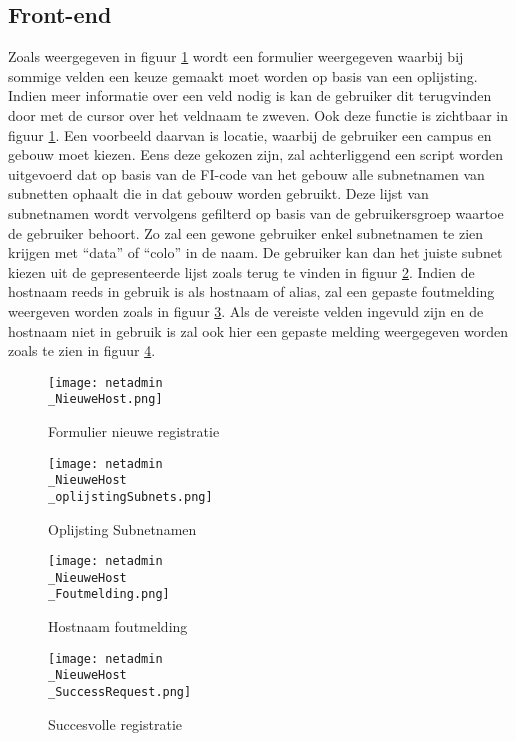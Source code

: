 \subsection{Front-end}
Zoals weergegeven in figuur \ref{fig:netadmin_NieuweHost} wordt een formulier weergegeven waarbij bij sommige velden een keuze gemaakt moet worden op basis van een oplijsting. Indien meer informatie over een veld nodig is kan de gebruiker dit terugvinden door met de cursor over het veldnaam te zweven. Ook deze functie is zichtbaar in figuur \ref{fig:netadmin_NieuweHost}.
Een voorbeeld daarvan is locatie, waarbij de gebruiker een campus en gebouw moet kiezen. Eens deze gekozen zijn, zal achterliggend een script worden uitgevoerd dat op basis van de FI-code van het gebouw alle subnetnamen van subnetten ophaalt die in dat gebouw worden gebruikt. Deze lijst van subnetnamen wordt vervolgens gefilterd op basis van de gebruikersgroep waartoe de gebruiker behoort. Zo zal een gewone gebruiker enkel subnetnamen te zien krijgen met “data” of “colo” in de naam. De gebruiker kan dan het juiste subnet kiezen uit de gepresenteerde lijst zoals terug te vinden in figuur \ref{fig:netadmin_NieuweHost_oplijstingSubnets}. Indien de hostnaam reeds in gebruik is als hostnaam of alias, zal een gepaste foutmelding weergeven worden zoals in figuur \ref{fig:netadmin_NieuweHost_Foutmelding}. Als de vereiste velden ingevuld zijn en de hostnaam niet in gebruik is zal ook hier een gepaste melding weergegeven worden zoals te zien in figuur \ref{fig:netadmin_NieuweHost_SuccessRequest}.
\begin{figure}[H]
    \texttt{[image: netadmin\\\_NieuweHost.png]}
    \caption{Formulier nieuwe registratie}
    \label{fig:netadmin_NieuweHost}
\end{figure}
\begin{figure}[H]
    \texttt{[image: netadmin\\\_NieuweHost\\\_oplijstingSubnets.png]}
    \caption{Oplijsting Subnetnamen}
    \label{fig:netadmin_NieuweHost_oplijstingSubnets}
\end{figure}
\begin{figure}[H]
    \texttt{[image: netadmin\\\_NieuweHost\\\_Foutmelding.png]}
    \caption{Hostnaam foutmelding}
    \label{fig:netadmin_NieuweHost_Foutmelding}
\end{figure}
\begin{figure}[H]
    \texttt{[image: netadmin\\\_NieuweHost\\\_SuccessRequest.png]}
    \caption{Succesvolle registratie}
    \label{fig:netadmin_NieuweHost_SuccessRequest}
\end{figure}
